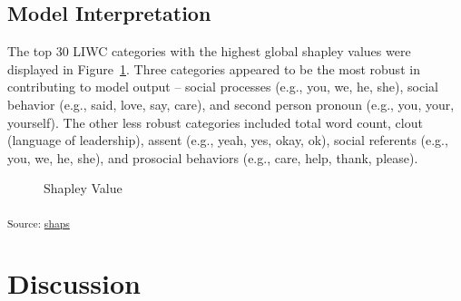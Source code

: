 \documentclass[
  letterpaper,
  DIV=11,
  numbers=noendperiod]{scrartcl}
\begin{document}
\subsection{Model Interpretation}\label{model-interpretation}

The top 30 LIWC categories with the highest global shapley values were
displayed in Figure~\ref{fig-shaps}. Three categories appeared to be the
most robust in contributing to model output -- social processes (e.g.,
you, we, he, she), social behavior (e.g., said, love, say, care), and
second person pronoun (e.g., you, your, yourself). The other less robust
categories included total word count, clout (language of leadership),
assent (e.g., yeah, yes, okay, ok), social referents (e.g., you, we, he,
she), and prosocial behaviors (e.g., care, help, thank, please).

\begin{figure}[H]


\caption{\label{fig-shaps}Shapley Value}

\end{figure}%

\textsubscript{Source:
\href{https://jjcurtin.github.io/study_messages/notebooks/fig_shaps-preview.html\#cell-fig-shaps}{shaps}}

\newpage

\section{Discussion}\label{discussion}
\end{document}
